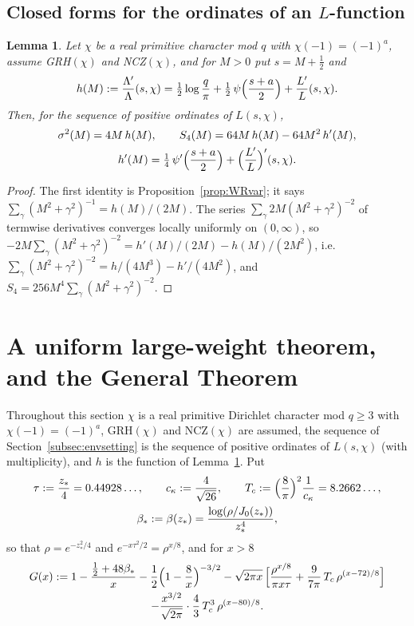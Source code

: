 \documentclass[11pt]{amsart}
\newtheorem{lemma}[theorem]{Lemma}
\theoremstyle{definition}
\numberwithin{equation}{section}
\begin{document}
\subsection{Closed forms for the ordinates of an \texorpdfstring{$L$}{L}-function}

\begin{lemma}\label{lem:S4}
Let $\chi$ be a real primitive character mod $q$ with
$\chi(-1)=(-1)^a$, assume GRH$(\chi)$ and NCZ$(\chi)$, and for $M>0$
put $s=M+\tfrac12$ and
\[
h(M):=\frac{\Lambda'}{\Lambda}(s,\chi)
=\tfrac12\log\frac q\pi+\tfrac12\,\psi\Bigl(\frac{s+a}{2}\Bigr)+\frac{L'}{L}(s,\chi).
\]
Then, for the sequence of positive ordinates of $L(s,\chi)$,
\begin{gather*}
\sigma^2(M)=4M\,h(M),\qquad
S_4(M)=64M\,h(M)-64M^2\,h'(M),\\
h'(M)=\tfrac14\,\psi'\Bigl(\frac{s+a}{2}\Bigr)+\Bigl(\frac{L'}{L}\Bigr)'(s,\chi).
\end{gather*}
\end{lemma}

\begin{proof}
The first identity is Proposition~\ref{prop:WRvar}; it says
$\sum_\gamma(M^2+\gamma^2)^{-1}=h(M)/(2M)$. The series
$\sum_\gamma2M(M^2+\gamma^2)^{-2}$ of termwise derivatives converges
locally uniformly on $(0,\infty)$, so
$-2M\sum_\gamma(M^2+\gamma^2)^{-2}=h'(M)/(2M)-h(M)/(2M^2)$, i.e.\
$\sum_\gamma(M^2+\gamma^2)^{-2}=h/(4M^3)-h'/(4M^2)$, and
$S_4=256M^4\sum_\gamma(M^2+\gamma^2)^{-2}$.
\end{proof}

\section{A uniform large-weight theorem, and the General Theorem}
\label{sec:largeweight}

Throughout this section $\chi$ is a real primitive Dirichlet character
mod $q\ge3$ with $\chi(-1)=(-1)^a$, GRH$(\chi)$ and NCZ$(\chi)$ are
assumed, the sequence of Section~\ref{subsec:envsetting} is the
sequence of positive ordinates of $L(s,\chi)$ (with multiplicity), and
$h$ is the function of Lemma~\ref{lem:S4}. Put
\begin{gather*}
\tau:=\frac{z_*}{4}=0.44928\ldots,\qquad
c_\kappa:=\frac{4}{\sqrt{26}},\qquad
T_c:=\Bigl(\frac8\pi\Bigr)^2\frac1{c_\kappa}=8.2662\ldots,\\
\beta_*:=\beta(z_*)=\frac{\log(\rho/J_0(z_*))}{z_*^4},
\end{gather*}
so that $\rho=e^{-z_*^2/4}$ and $e^{-x\tau^2/2}=\rho^{x/8}$, and for
$x>8$
\begin{multline}\label{eq:defG}
G(x):=1-\frac{\frac12+48\beta_*}{x}-\frac12\Bigl(1-\frac8x\Bigr)^{-3/2}
-\sqrt{2\pi x}\,\Bigl[\frac{\rho^{x/8}}{\pi x\tau}
+\frac{9}{7\pi}\,T_c\,\rho^{(x-72)/8}\Bigr]\\
-\frac{x^{3/2}}{\sqrt{2\pi}}\cdot\frac43\,T_c^3\,\rho^{(x-80)/8}.
\end{multline}
\end{document}
